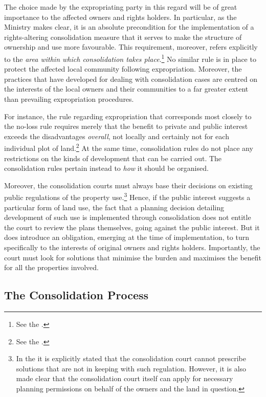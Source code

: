 {The choice made by the expropriating party in this regard will be of great importance to the affected owners and rights holders. In particular, as the Ministry makes clear, it is an absolute precondition for the implementation of a rights-altering consolidation measure that it serves to make the structure of ownership and use more favourable. This requirement, moreover, refers explicitly to the \emph{area within which consolidation takes place}.\footnote{See the \dni\cite[3-3]{lca13}.} No similar rule is in place to protect the affected local community following expropriation. Moreover, the practices that have developed for dealing with consolidation cases are centred on the interests of the local owners and their communities to a far greater extent than prevailing expropriation procedures.

For instance, the rule regarding expropriation that corresponds most closely to the no-loss rule requires merely that the benefit to private and public interest exceeds the disadvantages \emph{overall}, not locally and certainly not for each individual plot of land.\footnote{See the \dni\cite[2]{ea59}.} At the same time, consolidation rules do not place any restrictions on the kinds of development that can be carried out. The consolidation rules pertain instead to \emph{how} it should be organised. 

Moreover, the consolidation courts must always base their decisions on existing public regulations of the property use.\footnote{In the \dni\cite[3-17]{lca13} it is explicitly stated that the consolidation court cannot prescribe solutions that are not in keeping with such regulation. However, it is also made clear that the consolidation court itself can apply for necessary planning permissions on behalf of the owners and the land in question.} Hence, if the public interest suggests a particular form of land use, the fact that a planning decision detailing development of such use is implemented through consolidation does not entitle the court to review the plans themselves, going against the public interest. But it does introduce an obligation, emerging at the time of implementation, to turn specifically to the interests of original owners and rights holders. Importantly, the court must look for solutions that minimise the burden and maximises the benefit for all the properties involved.
}

\subsection{The Consolidation Process}\label{sec:6:3:1}

